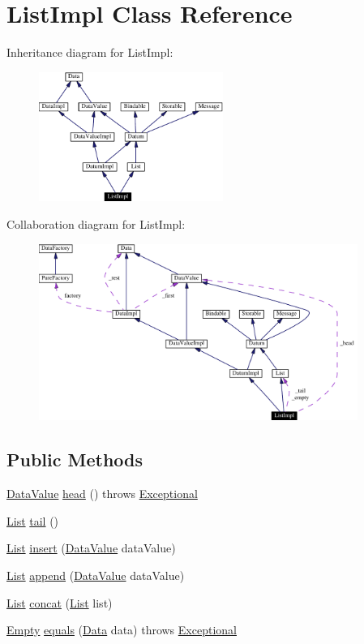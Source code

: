 \hypertarget{classListImpl}{
\section{List\-Impl  Class Reference}
\label{classListImpl}
}
Inheritance diagram for List\-Impl:\begin{figure}[H]
\begin{center}
\leavevmode
\includegraphics[width=170pt]{classListImpl__inherit__graph}
\end{center}
\end{figure}
Collaboration diagram for List\-Impl:\begin{figure}[H]
\begin{center}
\leavevmode
\includegraphics[width=295pt]{classListImpl__coll__graph}
\end{center}
\end{figure}
\subsection*{Public Methods}
\begin{CompactItemize}
\item 
\hyperlink{interfaceDataValue}{Data\-Value} \hyperlink{classListImpl_a0}{head} () throws \hyperlink{classExceptional}{Exceptional}
\item 
\hyperlink{interfaceList}{List} \hyperlink{classListImpl_a1}{tail} ()
\item 
\hyperlink{interfaceList}{List} \hyperlink{classListImpl_a2}{insert} (\hyperlink{interfaceDataValue}{Data\-Value} data\-Value)
\item 
\hyperlink{interfaceList}{List} \hyperlink{classListImpl_a3}{append} (\hyperlink{interfaceDataValue}{Data\-Value} data\-Value)
\item 
\hyperlink{interfaceList}{List} \hyperlink{classListImpl_a4}{concat} (\hyperlink{interfaceList}{List} list)
\item 
\hyperlink{interfaceEmpty}{Empty} \hyperlink{classListImpl_a5}{equals} (\hyperlink{interfaceData}{Data} data) throws \hyperlink{classExceptional}{Exceptional}
\end{CompactItemize}
